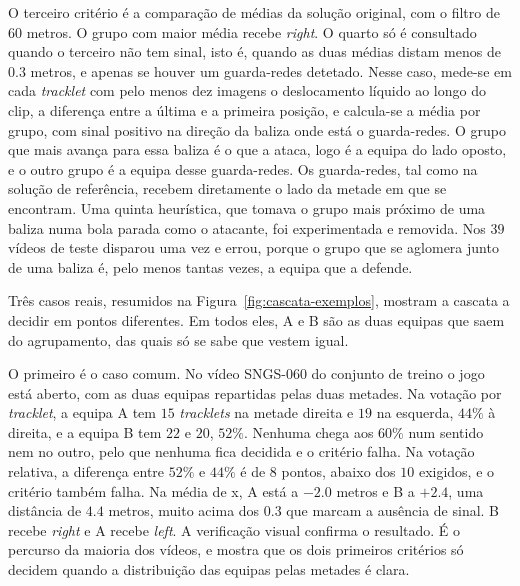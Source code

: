 O terceiro critério é a comparação de médias da solução original, com o filtro de $60$ metros. O grupo com maior média recebe \emph{right}. O quarto só é consultado quando o terceiro não tem sinal, isto é, quando as duas médias distam menos de $0.3$ metros, e apenas se houver um guarda-redes detetado. Nesse caso, mede-se em cada \emph{tracklet} com pelo menos dez imagens o deslocamento líquido ao longo do clip, a diferença entre a última e a primeira posição, e calcula-se a média por grupo, com sinal positivo na direção da baliza onde está o guarda-redes. O grupo que mais avança para essa baliza é o que a ataca, logo é a equipa do lado oposto, e o outro grupo é a equipa desse guarda-redes. Os guarda-redes, tal como na solução de referência, recebem diretamente o lado da metade em que se encontram. Uma quinta heurística, que tomava o grupo mais próximo de uma baliza numa bola parada como o atacante, foi experimentada e removida. Nos $39$ vídeos de teste disparou uma vez e errou, porque o grupo que se aglomera junto de uma baliza é, pelo menos tantas vezes, a equipa que a defende.

Três casos reais, resumidos na Figura~\ref{fig:cascata-exemplos}, mostram a cascata a decidir em pontos diferentes. Em todos eles, A e B são as duas equipas que saem do agrupamento, das quais só se sabe que vestem igual.

O primeiro é o caso comum. No vídeo SNGS-060 do conjunto de treino o jogo está aberto, com as duas equipas repartidas pelas duas metades. Na votação por \emph{tracklet}, a equipa A tem $15$ \emph{tracklets} na metade direita e $19$ na esquerda, $44\%$ à direita, e a equipa B tem $22$ e $20$, $52\%$. Nenhuma chega aos $60\%$ num sentido nem no outro, pelo que nenhuma fica decidida e o critério falha. Na votação relativa, a diferença entre $52\%$ e $44\%$ é de $8$ pontos, abaixo dos $10$ exigidos, e o critério também falha. Na média de x, A está a $-2.0$ metros e B a $+2.4$, uma distância de $4.4$ metros, muito acima dos $0.3$ que marcam a ausência de sinal. B recebe \emph{right} e A recebe \emph{left}. A verificação visual confirma o resultado. É o percurso da maioria dos vídeos, e mostra que os dois primeiros critérios só decidem quando a distribuição das equipas pelas metades é clara.

